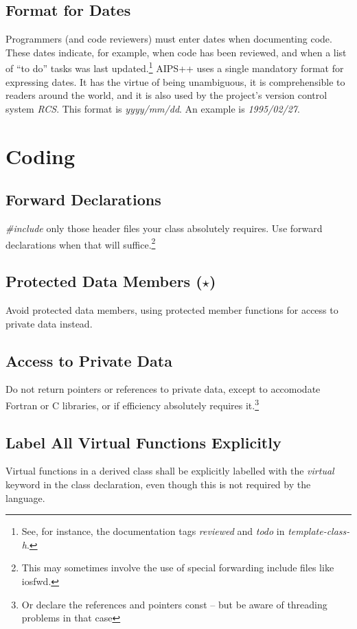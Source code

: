 \subsection {Format for Dates}
Programmers (and code reviewers) must enter dates when documenting code.
These dates indicate, for example, when code has been reviewed, and when a list 
of ``to do'' tasks was last updated.\footnote{See, for instance, the 
documentation tags {\em reviewed} and {\em todo} in {\em template-class-h}.}
AIPS++ uses a single mandatory format for expressing dates.  It has the virtue
of being unambiguous, it is comprehensible to readers around the world, and
it is also used by the project's version control system {\em RCS}.  This 
format is {\em yyyy/mm/dd}. An example is {\em 1995/02/27}.
\section {Coding}
\subsection {Forward Declarations}
{\em \#include} only those header files your class absolutely requires.  Use
\bmar forward declarations when that will suffice.\footnote {This may sometimes
involve the use of special forwarding include files like iosfwd.}
\subsection {Protected Data Members ($\star$)}
Avoid protected data members, using protected member functions for access
to private data instead.
\subsection {Access to Private Data}
Do not return pointers or references to private data, except to accomodate
Fortran or C libraries, or if efficiency absolutely requires it.\footnote {Or
declare the references and pointers const -- but be aware of threading
problems in that case}
\subsection {Label All Virtual Functions Explicitly}
Virtual functions in a derived class shall be explicitly labelled with
the {\em virtual} keyword in the class declaration, even though this is
 not required by the language.

